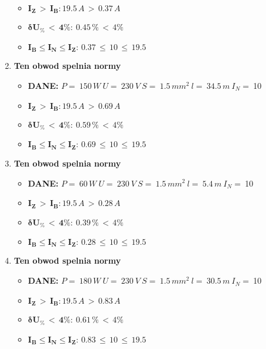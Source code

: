 \begin{enumerate}
\begin{itemize}
\item[\textcolor{Green}{\cmark}] $ \pmb{I_Z \, >  \, I_B: }19.5 \, A \, > \,0.37 \, A $
\item[\textcolor{Green}{\cmark}] $ \pmb{ \delta U_\% \, < \, 4\%:} \:0.45 \, \% \,< \, 4\% $
\item[\textcolor{Green}{\cmark}] $ \pmb{I_B \le I_N \le I_Z: } \, 0.37 \, \le \,10 \, \le \,19.5 $
\end{itemize}
\item \textcolor{Green}{\cmark} \textbf{Ten obwod spelnia normy} 
\begin{itemize}
\item[] \textbf{DANE: } \: $ P = \:150\, W\: U = \:230\: V\: S = \:1.5\, mm^2\: l = \:34.5\, m\: I_N= \: $10
\item[\textcolor{Green}{\cmark}] $ \pmb{I_Z \, >  \, I_B: }19.5 \, A \, > \,0.69 \, A $
\item[\textcolor{Green}{\cmark}] $ \pmb{ \delta U_\% \, < \, 4\%:} \:0.59 \, \% \,< \, 4\% $
\item[\textcolor{Green}{\cmark}] $ \pmb{I_B \le I_N \le I_Z: } \, 0.69 \, \le \,10 \, \le \,19.5 $
\end{itemize}
\item \textcolor{Green}{\cmark} \textbf{Ten obwod spelnia normy} 
\begin{itemize}
\item[] \textbf{DANE: } \: $ P = \:60\, W\: U = \:230\: V\: S = \:1.5\, mm^2\: l = \:5.4\, m\: I_N= \: $10
\item[\textcolor{Green}{\cmark}] $ \pmb{I_Z \, >  \, I_B: }19.5 \, A \, > \,0.28 \, A $
\item[\textcolor{Green}{\cmark}] $ \pmb{ \delta U_\% \, < \, 4\%:} \:0.39 \, \% \,< \, 4\% $
\item[\textcolor{Green}{\cmark}] $ \pmb{I_B \le I_N \le I_Z: } \, 0.28 \, \le \,10 \, \le \,19.5 $
\end{itemize}
\item \textcolor{Green}{\cmark} \textbf{Ten obwod spelnia normy} 
\begin{itemize}
\item[] \textbf{DANE: } \: $ P = \:180\, W\: U = \:230\: V\: S = \:1.5\, mm^2\: l = \:30.5\, m\: I_N= \: $10
\item[\textcolor{Green}{\cmark}] $ \pmb{I_Z \, >  \, I_B: }19.5 \, A \, > \,0.83 \, A $
\item[\textcolor{Green}{\cmark}] $ \pmb{ \delta U_\% \, < \, 4\%:} \:0.61 \, \% \,< \, 4\% $
\item[\textcolor{Green}{\cmark}] $ \pmb{I_B \le I_N \le I_Z: } \, 0.83 \, \le \,10 \, \le \,19.5 $

\end{itemize}
\end{enumerate}
